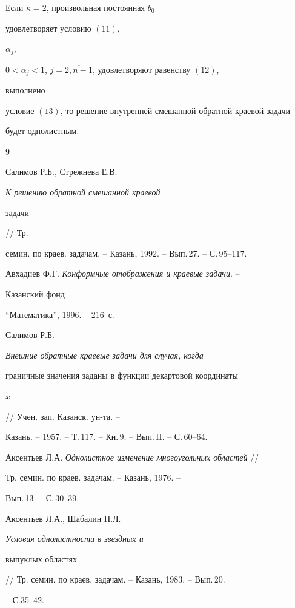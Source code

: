 \begin{thm} Если $\kappa = 2$, произвольная постоянная $b_0$


удовлетворяет условию $(11)$,\linebreak


$\alpha_j$,


$0<\alpha_j<1$, $j=\overline{2,n-1}$, удовлетворяют равенству $(12)$,


выполнено


условие $(13)$, то решение внутренней смешанной обратной краевой задачи 


будет однолистным.


\end{thm}





\begin{thebibliography}{9}







Салимов Р.Б., Стрежнева Е.В. {\em К решению обратной смешанной краевой 


задачи} // Тр.


семин. по краев. задачам. -- Казань, 1992. -- Вып.\,27. -- С.\,95--117.




Авхадиев Ф.Г. {\em Конформные отображения и краевые задачи}. --


Казанский фонд


``Математика'', 1996. -- 216~с.




Салимов Р.Б. {\em Внешние обратные краевые задачи для случая, когда


граничные значения заданы в функции декартовой координаты


$x$} // Учен. зап. Казанск. ун-та. --


Казань. -- 1957. -- Т.\,117. -- Кн.\,9. -- Вып.\,II. -- С.\,60--64.




Аксентьев Л.А. {\em Однолистное изменение многоугольных областей} //


Тр. семин. по краев. задачам. -- Казань, 1976. --


Вып.\,13. -- С.\,30--39.




Аксентьев Л.А., Шабалин П.Л. {\em Условия однолистности в звездных и


выпуклых областях}


// Тр. семин. по краев. задачам. -- Казань, 1983. -- Вып.\,20.


-- С.35--42.








\end{thebibliography}





\vskip 2cm












\label{end}





